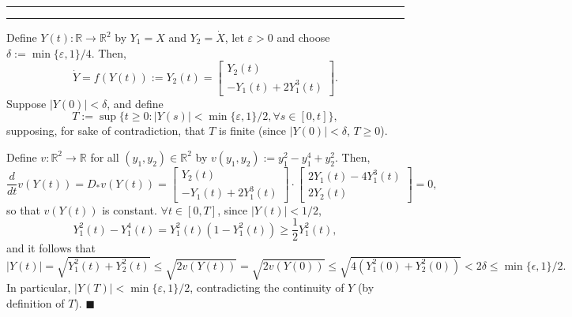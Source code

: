 \documentclass[11pt]{article}
\newcounter{questionCounter}
\newcounter{partCounter}[questionCounter]
\newenvironment{question}[2][\arabic{questionCounter}]{%
    \setcounter{partCounter}{0}%
    \vspace{.25in} \hrule \vspace{0.5em}%
        \noindent{\bf #2}%
    \vspace{0.8em} \hrule \vspace{.10in}%
    \addtocounter{questionCounter}{1}%
}{}
\renewcommand{\qed}{\quad $\blacksquare$}
\newcommand{\R}{\mathbb{R}} %
\newcommand{\e}{\varepsilon} %
\begin{document}
\begin{question}{Problem 4}
Define $Y(t) : \R \rightarrow \R^2$ by $Y_1 = X$ and $Y_2 = \dot X$, let
$\e > 0$ and choose $\delta := \min\{\e,1\}/4$. Then,
\[\dot Y
    = f(Y(t)) := Y_2(t)
    = \left[ \begin{array}{c} Y_2 (t)\\ -Y_1(t)+2Y_1^3(t) \end{array} \right].
\]
Suppose $|Y(0)| < \delta$, and define
\[T := \sup \{t \geq 0 : |Y(s)| < \min\{\e, 1\}/2, \forall s \in [0,t]\},\]
supposing, for sake of contradiction, that $T$ is finite (since
$|Y(0)| < \delta$, $T \geq 0$).

Define $v : \R^2 \rightarrow \R$ for all $(y_1,y_2) \in \R^2$ by
$v(y_1,y_2) := y_1^2 - y_1^4 + y_2^2$. Then,
\[\frac{d}{dt} v(Y(t))
    = D_*v(Y(t))
    = \left[ \begin{array}{c} Y_2 (t)\\ -Y_1(t)+2Y_1^3(t) \end{array} \right]
    \cdot \left[ \begin{array}{c} 2Y_1(t)-4Y_1^3(t) \\ 2Y_2(t) \end{array} \right]
    = 0,
\]
so that $v(Y(t))$ is constant. $\forall t \in [0,T]$, since
$|Y(t)| < 1/2$,
\[Y_1^2(t) - Y_1^4(t) = Y_1^2(t)(1 - Y_1^2(t)) \geq \frac12 Y_1^2(t),\]
and it follows that
\[|Y(t)| = \sqrt{Y_1^2(t) + Y_2^2(t)}
    \leq \sqrt{2v(Y(t))}
    = \sqrt{2v(Y(0))}
    \leq \sqrt{4(Y_1^2(0) + Y_2^2(0))}
    < 2\delta
    \leq \min\{\epsilon,1\}/2.
\]
In particular, $|Y(T)| < \min\{\e,1\}/2$, contradicting the continuity of $Y$
(by definition of $T$). \qed
\end{question}
\end{document}
